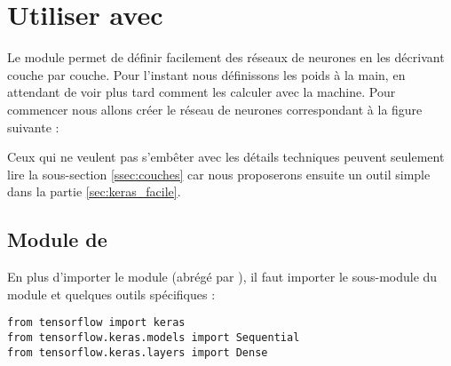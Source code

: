 \documentclass[11pt,class=report,crop=false]{standalone}
\begin{document}








\section{Utiliser \tensorflow{} avec \keras}

Le module \keras{} permet de définir facilement des réseaux de neurones en les décrivant couche par couche.
Pour l'instant nous définissons les poids à la main, en attendant de voir plus tard comment les calculer avec la machine.
Pour commencer nous allons créer le réseau de neurones correspondant à la figure suivante :



Ceux qui ne veulent pas s'embêter avec les détails techniques peuvent seulement lire la sous-section \ref{ssec:couches} car nous proposerons ensuite un outil simple dans la partie \ref{sec:keras_facile}.


\subsection{Module \keras{} de \tensorflow{}}
\label{ssec:keras}

En plus d'importer le module  (abrégé par ), il faut importer le sous-module  du module  et quelques outils spécifiques :

\begin{lstlisting}
from tensorflow import keras
from tensorflow.keras.models import Sequential
from tensorflow.keras.layers import Dense
\end{lstlisting} 
\end{document}
